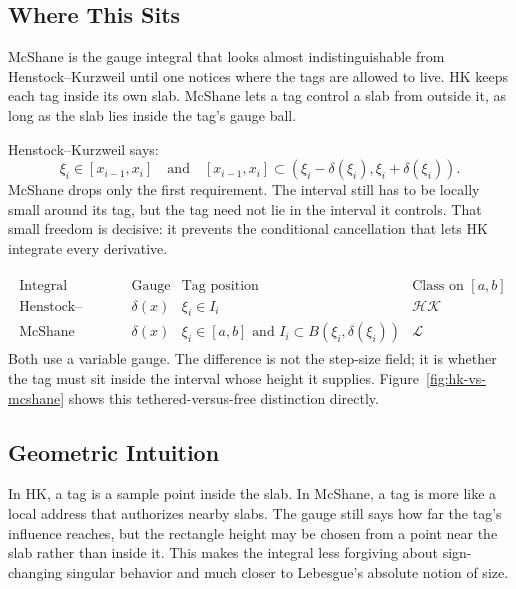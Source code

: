\subsection*{Where This Sits}

\begin{exposition}
McShane is the gauge integral that looks almost indistinguishable from
Henstock--Kurzweil until one notices where the tags are allowed to live. HK
keeps each tag inside its own slab. McShane lets a tag control a slab from
outside it, as long as the slab lies inside the tag's gauge ball.
\end{exposition}

\begin{remark*}[Interpretation]
Henstock--Kurzweil says:
\[
  \xi_i\in[x_{i-1},x_i]
  \quad\text{and}\quad
  [x_{i-1},x_i]\subset
  (\xi_i-\delta(\xi_i),\xi_i+\delta(\xi_i)).
\]
McShane drops only the first requirement. The interval still has to be locally
small around its tag, but the tag need not lie in the interval it controls.
That small freedom is decisive: it prevents the conditional cancellation that
lets HK integrate every derivative.
\end{remark*}

\begin{remark*}[Interpretation]
\[
\begin{aligned}
\begin{array}{c|c|c|c}
\text{Integral} & \text{Gauge} & \text{Tag position} & \text{Class on }[a,b]\\
\hline
\text{Henstock--Kurzweil} & \delta(x) & \xi_i\in I_i &
\mathcal{HK}\\
\text{McShane} & \delta(x) & \xi_i\in[a,b]\text{ and }I_i\subset B(\xi_i,\delta(\xi_i)) &
\mathcal L
\end{array}
\end{aligned}
\]
Both use a variable gauge. The difference is not the step-size field; it is
whether the tag must sit inside the interval whose height it supplies.
Figure~\ref{fig:hk-vs-mcshane} shows this tethered-versus-free distinction
directly.
\end{remark*}



\subsection*{Geometric Intuition}

\begin{exposition}
In HK, a tag is a sample point inside the slab. In McShane, a tag is more like
a local address that authorizes nearby slabs. The gauge still says how far the
tag's influence reaches, but the rectangle height may be chosen from a point
near the slab rather than inside it. This makes the integral less forgiving
about sign-changing singular behavior and much closer to Lebesgue's absolute
notion of size.
\end{exposition}

